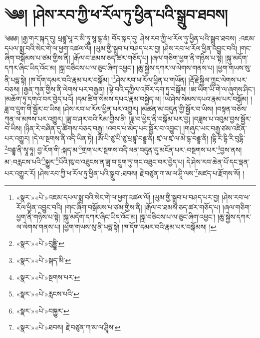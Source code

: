 \chapter{༄༅། །ཤེས་རབ་ཀྱི་ཕ་རོལ་ཏུ་ཕྱིན་པའི་སྒྲུབ་ཐབས།}༄༅༅། །རྒྱ་གར་སྐད་དུ། པྲཛྙཱ་པཱ་ར་མི་ཏཱ་སཱ་དྷ་ནཾ། བོད་སྐད་དུ། ཤེས་རབ་ཀྱི་ཕ་རོལ་ཏུ་ཕྱིན་པའི་སྒྲུབ་ཐབས། :འཇམ་དཔལ་སྨྲ་བའི་སེང་གེ་ལ་ཕྱག་འཚལ་ལོ། །ཡུམ་གྱི་སྒྲུབ་པ་བཤད་པར་བྱ། །ཤེས་རབ་ཕ་རོལ་ཕྱིན་འབྱུང་བའི། །གང་ཞིག་བསྒོམས་པ་ཙམ་གྱིས་ནི། །རྒོལ་བ་ཐམས་ཅད་ཚར་གཅོད་པ། །ཞལ་གཅིག་ཕྱག་ནི་གཉིས་པ་སྟེ། །སྐུ་མདོག་དཀར་ཞིང་ཡིད་འོང་མ། །སྐྲ་བཅིངས་པ་ལ་ཅུང་ཞིག་འཕྱང་། །ཆུ་སྐྱེས་དཀར་ལ་ལེགས་གནས་པ། །ཕྱག་གཡས་སུ་ནི་པདྨ་སྟེ། །ཁ་དོག་དམར་བའི་རྣམ་པར་བསྒོམ། །\footnote{«སྣར་»«པེ་»འཇམ་དཔལ་སྨྲ་བའི་སེང་གེ་ལ་ཕྱག་འཚལ་ལོ། །ཡུམ་གྱི་སྒྲུབ་པ་བཤད་པར་བྱ། །ཤེས་རབ་ཕ་རོལ་ཕྱིན་འབྱུང་བའི། །གང་ཞིག་བསྒོམས་པ་ཙམ་གྱིས་ནི། །རྒོལ་བ་ཐམས་ཅད་ཚར་གཅོད་པ། །ཞལ་གཅིག་ཕྱག་ནི་གཉིས་པ་སྟེ། །སྐུ་མདོག་དཀར་ཞིང་ཡིད་འོང་མ། །སྐྲ་བཅིངས་པ་ལ་ཅུང་ཞིག་འཕྱང་། །ཆུ་སྐྱེས་དཀར་ལ་ལེགས་གནས་པ། །ཕྱག་གཡས་སུ་ནི་པདྨ་སྟེ། །ཁ་དོག་དམར་བའི་རྣམ་པར་བསྒོམས། །}ཤེས་རབ་ཕ་རོལ་ཕྱིན་པ་གཡོན། །རྡོ་རྗེ་སྐྱིལ་ཀྲུང་ལེགས་པར་བཅས། །རྒྱན་ཀུན་གྱིས་ནི་ལེགས་པར་བརྒྱན། །ལྟེ་བའི་དཀྱིལ་འཁོར་དག་ཏུ་བསྒོམ། །ཨ་ཡིག་ཡི་གེ་ལ་ཞུགས་ཤིང་། །མཆོག་ཏུ་དགའ་བར་བྱེད་པའོ། །དམ་ཚིག་སེམས་དཔའ་རྣམ་བསྐྱེད་ལ། །ཡེ་ཤེས་སེམས་དཔའ་རྣམ་པར་བསྒོམ། །ཟླ་བ་དྲུག་གི་སྦྱོར་བ་ཡིས། །ཤེས་རབ་ཕ་རོལ་ཕྱིན་པར་འགྱུར། །མཚན་མ་བདུན་གྱི་སྦྱོར་བ་ཡིས། །བསྟན་བཅོས་ཀུན་ལ་མཁས་པར་འགྱུར། །ཟླ་བ་ཤར་བའི་རིམ་གྱིས་ནི། །ཟླ་བ་ཕྱེད་ནི་བསྒོམ་པར་བྱ། །བཟླས་པ་འབུམ་བྱས་སྦྱོར་བ་ཡིས། །ཉིན་རེ་བཞིན་དུ་ཚིགས་བཅད་བརྒྱ། །འབད་པ་མེད་པར་སྦྱོར་བ་འབྱུང་། །གཞུང་ཡང་བརྒྱ་ཙམ་འཛིན་པར་འགྱུར། །དེ་ལ་སྔགས་ནི་འདི་ཡིན་ཏེ། །ཨོཾ་པི་ཙུ་པི་ཙུ་པྲཛྙཱ་བརྡྷ་ནི། ཛྭ་ལ་ཛྭ་ལ་མེ་དྷ་བརྡྷ་ནི། །དྷི་རི་དྷི་རི་བུདྷི་\footnote{«སྣར་»«པེ་»བུདྡྷི་}བརྡྷ་ནི་སྭཱ་ཧཱ། བྱ་རོག་གི་:སྐད་མ་\footnote{«སྣར་»«པེ་»སྐད་མི་}གྲག་པར་སྔགས་འདི་ལན་བདུན་དུ་མངོན་པར་:བསྔགས་པར་\footnote{«སྣར་»«པེ་»སྔགས་པར་}བྱས་ནས། མ་:བརླངས་པའི་\footnote{«སྣར་»«པེ་»རླངས་པའི་}སྐྱུར་\footnote{«སྣར་»«པེ་»བསྐྱུར་}པོའི་ཁུ་བ་འཐུངས་ན་ཟླ་བ་དྲུག་ཏུ་གང་འཐུང་བར་བྱེད་པ། དེ་ཤེས་རབ་ཆེན་པོ་དང་ལྡན་པར་འགྱུར་རོ། །ཤེས་རབ་ཀྱི་ཕ་རོལ་ཏུ་ཕྱིན་པའི་སྒྲུབ་:ཐབས། རྗེ་བཙུན་ཀ་མ་ལ་ཤཱི་ལས་\footnote{«སྣར་»«པེ་»ཐབས། རྗེ་བཙུན་ཀ་མ་ལ་ཤྲཱིས་}མཛད་པ་རྫོགས་སོ། ། 